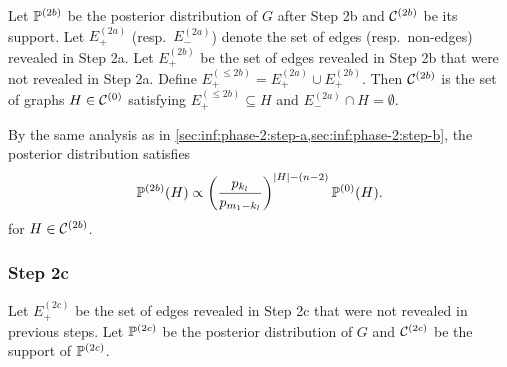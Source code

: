 Let $\mathbb{P}^{(2b)}$ be the posterior distribution of $G$ after Step 2b and $\mathcal{C}^{(2b)}$ be its support.
Let $E^{(2a)}_+$ (resp.~$E^{(2a)}_-$) denote the set of edges (resp.~non-edges) revealed in Step 2a.
Let $E^{(2b)}_+$ be the set of edges revealed in Step 2b that were not revealed in Step 2a.
Define $E^{(\le 2b)}_+ = E^{(2a)}_+ \cup E^{(2b)}_+$.
Then $\mathcal{C}^{(2b)}$ is the set of graphs $H\in \mathcal{C}^{(0)}$ satisfying $E^{(\le 2b)}_+ \subseteq H$ and $E^{(2a)}_-\cap H = \emptyset$.

By the same analysis as in \cref{sec:inf:phase-2:step-a,sec:inf:phase-2:step-b}, the posterior distribution satisfies
\begin{align} \label{eqn:conn-phase-2-step-b:post}
  \mathbb{P}^{(2b)}(H) \propto \left(\frac{p_{k_l}}{p_{m_1-k_l}}\right)^{|H|-(n-2)} \mathbb{P}^{(0)}(H).
\end{align}
for $H\in \mathcal{C}^{(2b)}$.

\subsubsection{Step 2c} \label{sec:conn:phase-2:step-c}
Let $E^{(2c)}_+$ be the set of edges revealed in Step 2c that were not revealed in previous steps.
Let $\mathbb{P}^{(2c)}$ be the posterior distribution of $G$ and $\mathcal{C}^{(2c)}$ be the support of $\mathbb{P}^{(2c)}$.

